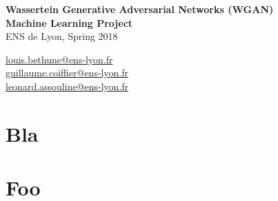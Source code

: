 \documentclass[a4paper]{report}
\begin{document}
\begin{titlepage}
\begin{center}
 {\Huge\bfseries Wassertein Generative Adversarial Networks (WGAN)\\}
 \vspace{2cm}
 {\Large \bfseries Machine Learning Project \\}
 \vspace{2cm}
 {\large ENS de Lyon, Spring 2018 \\}
 \vspace{2cm}

{\Large {} \color{black}
	\href{mailto:louis.bethune@ens-lyon.fr}{louis.bethune@ens-lyon.fr}\\
    \vspace{0.2cm}
	\href{mailto:guillaume.coiffier@ens-lyon.fr}{guillaume.coiffier@ens-lyon.fr}\\
	\vspace{0.2cm}
	\href{mailto:leonard.assouline@ens-lyon.fr}{leonard.assouline@ens-lyon.fr}\\
}

\vspace{2cm}

\vfill
\end{center}
\end{titlepage}

\setcounter{tocdepth}{1}
\tableofcontents

\chapter{Bla}

\lipsum

\chapter{Foo}

\lipsum
\end{document}
